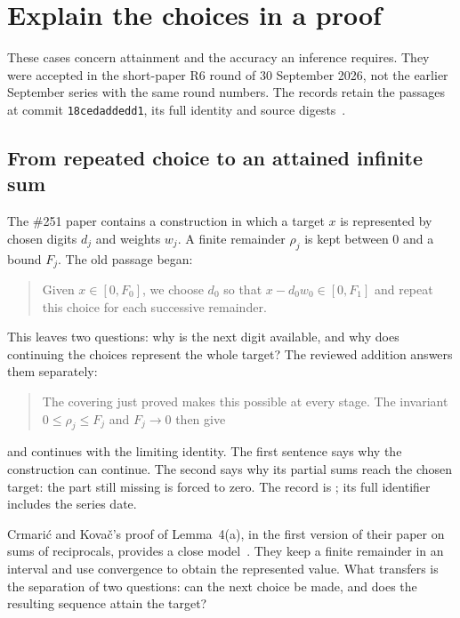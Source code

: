 \section{Explain the choices in a proof}\label{sec:revisions}

These cases concern attainment and the accuracy an inference requires.
They were accepted in the short-paper R6 round of 30 September 2026, not the
earlier September series with the same round numbers. The records retain
the passages at commit \texttt{18cedaddedd1}, its full identity and source
digests~\cite{ledger}.

\subsection{From repeated choice to an attained infinite sum}\label{sec:remainder}

The \#251 paper contains a construction in which a target $x$ is represented
by chosen digits $d_j$ and weights $w_j$. A finite remainder $\rho_j$ is kept
between $0$ and a bound $F_j$. The old passage began:
\begin{quote}
Given $x\in[0,F_0]$, we choose $d_0$ so that
$x-d_0w_0\in[0,F_1]$ and repeat this choice for each successive remainder.
\end{quote}
This leaves two questions: why is the next digit available, and why does
continuing the choices represent the whole target? The reviewed addition
answers them separately:
\begin{quote}
The covering just proved makes this possible at every stage. The invariant
$0\le\rho_j\le F_j$ and $F_j\to0$ then give
\end{quote}
and continues with the limiting identity. The first sentence says why the
construction can continue. The second says why its partial sums reach the
chosen target: the part still missing is forced to zero. The record is
; its full identifier includes the series date.

Crmari\'c and Kova\v{c}'s proof of Lemma~4(a), in the first version of their
paper on sums of reciprocals, provides a close model~\cite[pp.~4--5]{crmaric}.
They keep a finite remainder in an interval and use convergence to obtain
the represented value. What transfers is the separation of two questions:
can the next choice be made, and does the resulting sequence attain the target?

